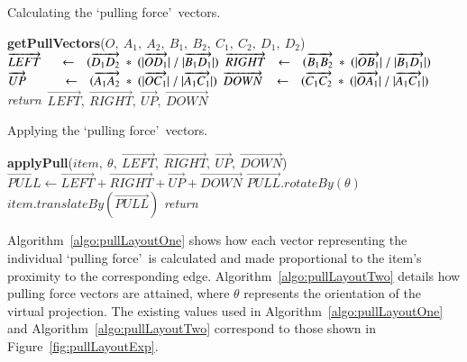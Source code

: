 \documentclass[review,5p,times,twocolumn]{elsarticle}
\newcommand{\INDSTATE}[1][1]{\STATE\hspace{#1\algorithmicindent}}
\begin{document}
\begin{algorithm}[h]
\caption{Calculating the \lq pulling force\rq~vectors.}
\label{algo:pullLayoutOne}
\begin{algorithmic}
\STATE \textbf{getPullVectors}($O,\ A_{1},\ A_{2},\ B_{1},\ B_{2},\ C_{1},\ C_{2},\ D_{1},\ D_{2}$)
\INDSTATE[2]$\overrightarrow{LEFT}\hspace{0.5cm} \leftarrow \hspace{0.25cm}(\overrightarrow{D_{1}D_{2}}\ *\ ( |\overrightarrow{OD_{1}}|\  /\ |\overrightarrow{B_{1}D_{1}}| )$
\INDSTATE[2]$\overrightarrow{RIGHT}\hspace{0.25cm} \leftarrow \hspace{0.25cm}(\overrightarrow{B_{1}B_{2}}\ *\ ( |\overrightarrow{OB_{1}}|\  /\ |\overrightarrow{B_{1}D_{1}}| )$
\INDSTATE[2]$\overrightarrow{UP}\hspace{1cm} \leftarrow \hspace{0.25cm}(\overrightarrow{A_{1}A_{2}}\ *\ ( |\overrightarrow{OC_{1}}|\  /\ |\overrightarrow{A_{1}C_{1}}| )$
\INDSTATE[2]$\overrightarrow{DOWN}\hspace{0.3cm} \leftarrow \hspace{0.25cm}(\overrightarrow{C_{1}C_{2}}\ *\ ( |\overrightarrow{OA_{1}}|\  /\ |\overrightarrow{A_{1}C_{1}}| )$
\STATE \textit{return}\ $\overrightarrow{LEFT},\ \overrightarrow{RIGHT},\ \overrightarrow{UP},\ \overrightarrow{DOWN}$
\end{algorithmic}
\end{algorithm}

\begin{algorithm}[h!]
\caption{Applying the \lq pulling force\rq~vectors.}
\label{algo:pullLayoutTwo}
\begin{algorithmic}
\STATE \textbf{applyPull}($item,\ \theta,\ \overrightarrow{LEFT},\ \overrightarrow{RIGHT},\ \overrightarrow{UP},\ \overrightarrow{DOWN}$)
\INDSTATE[2]$\overrightarrow{PULL} \leftarrow \overrightarrow{LEFT} + \overrightarrow{RIGHT} + \overrightarrow{UP} + \overrightarrow{DOWN}$
\INDSTATE[2]$\overrightarrow{PULL}.rotateBy(\theta)$
\INDSTATE[2]$item.translateBy(\overrightarrow{PULL})$
\STATE \textit{return}
\end{algorithmic}
\end{algorithm}

Algorithm~\ref{algo:pullLayoutOne} shows how each vector representing the individual \lq pulling force\rq\ is calculated and made proportional to the item's proximity to the corresponding edge.
Algorithm~\ref{algo:pullLayoutTwo} details how pulling force vectors are attained, where $\theta$ represents the orientation of the virtual projection.
The existing values used in Algorithm~\ref{algo:pullLayoutOne} and Algorithm~\ref{algo:pullLayoutTwo} correspond to those shown in Figure~\ref{fig:pullLayoutExp}.
\end{document}
